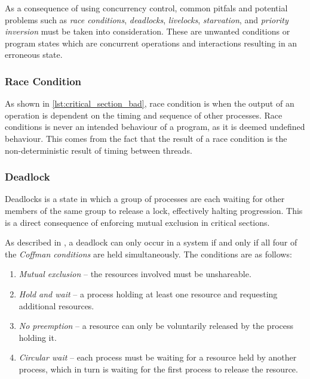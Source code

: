 As a consequence of using concurrency control, common pitfals and potential problems such as \textit{race conditions}, \textit{deadlocks}, \textit{livelocks}, \textit{starvation}, and \textit{priority inversion} must be taken into consideration. These are unwanted conditions or program states which are concurrent operations and interactions resulting in an erroneous state.


\subsubsection{Race Condition}


As shown in \cref{lst:critical_section_bad}, race condition is when the output of an operation is dependent on the timing and sequence of other processes. Race conditions is never an intended behaviour of a program, as it is deemed undefined behaviour. This comes from the fact that the result of a race condition is the non\hyp{}deterministic result of timing between threads. 


\subsubsection{Deadlock}


Deadlocks is a state in which a group of processes are each waiting for other members of the same group to release a lock, effectively halting progression. This is a direct consequence of enforcing mutual exclusion in critical sections. 

As described in \citet[page 239]{silberschatz2006operating}, a deadlock can only occur in a system if and only if all four of the \textit{Coffman conditions}\citep[First described][page 70]{coffman1971system} are held simultaneously. The conditions are as follows:

\begin{enumerate}[topsep=0em,itemsep=-1em,partopsep=0.5em,parsep=1em]
    \item \textit{Mutual exclusion} -- the resources involved must be unshareable.
    \item \textit{Hold and wait} -- a process holding at least one resource and requesting additional resources.
    \item \textit{No preemption} -- a resource can only be voluntarily released by the process holding it.
    \item \textit{Circular wait} -- each process must be waiting for a resource held by another process, which in turn is waiting for the first process to release the resource.
\end{enumerate}

